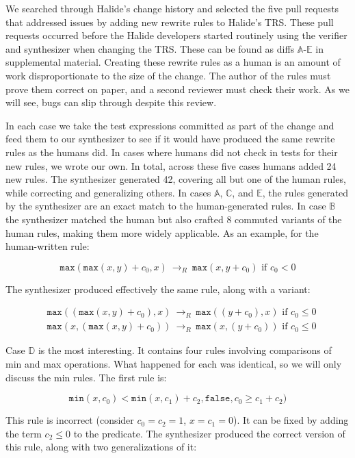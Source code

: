 \documentclass[acmsmall,review,anonymous]{acmart}\settopmatter{printfolios=true,printccs=false,printacmref=false}
\newcommand{\hmax}[0]{\texttt{max}}
\newcommand{\hmin}[0]{\texttt{min}}
\newcommand{\rewrites}[0]{\:\rightarrow_{R}\:}
\newcommand{\pred}[0]{\textrm{ if }}
\newcommand{\hfalse}[0]{\texttt{false}}
\begin{document}
We searched through Halide’s change history and selected the five pull requests that addressed issues by adding new rewrite rules to Halide’s TRS. These pull requests occurred before the Halide developers started routinely using the verifier and synthesizer when changing the TRS. These can be found as diffs $\mathbb{A}$-$\mathbb{E}$ in supplemental material. Creating these rewrite rules as a human is an amount of work disproportionate to the size of the change. The author of the rules must prove them correct on paper, and a second reviewer must check their work. As we will see, bugs can slip through despite this review. 

In each case we take the test expressions committed as part of the change and feed them to our synthesizer to see if it would have produced the same rewrite rules as the humans did. In cases where humans did not check in tests for their new rules, we wrote our own. In total, across these five cases humans added 24 new rules. The synthesizer generated 42, covering all but one of the human rules, while correcting and generalizing others. In cases $\mathbb{A}$, $\mathbb{C}$, and $\mathbb{E}$, the rules generated by the synthesizer are an exact match to the human-generated rules. In case $\mathbb{B}$ the synthesizer matched the human but also crafted 8 commuted variants of the human rules, making them more widely applicable. As an example, for the human-written rule:

\[
\hmax(\hmax(x, y) + c_0, x) \rewrites \hmax(x, y + c_0) \pred c_0 < 0
\]

The synthesizer produced effectively the same rule, along with a variant:

\begin{align*}
& \hmax((\hmax(x, y) + c_0), x) \rewrites \hmax((y + c_0), x) \pred c_0 \leq 0 \\
& \hmax(x, (\hmax(x, y) + c_0)) \rewrites \hmax(x, (y + c_0)) \pred c_0 \leq 0
\end{align*}

Case $\mathbb{D}$ is the most interesting. It contains four rules involving comparisons of min and max operations. What happened for each was identical, so we will only discuss the min rules. The first rule is:

\[
\hmin(x, c_0) < \hmin(x, c_1) + c_2, \hfalse, c_0 \geq c_1 + c_2)
\]

This rule is incorrect (consider $c_0 = c_2 = 1$, $x = c_1 = 0$). It can be fixed by adding the term $c_2 \leq 0$ to the predicate. The synthesizer produced the correct version of this rule, along with two generalizations of it:
\end{document}
